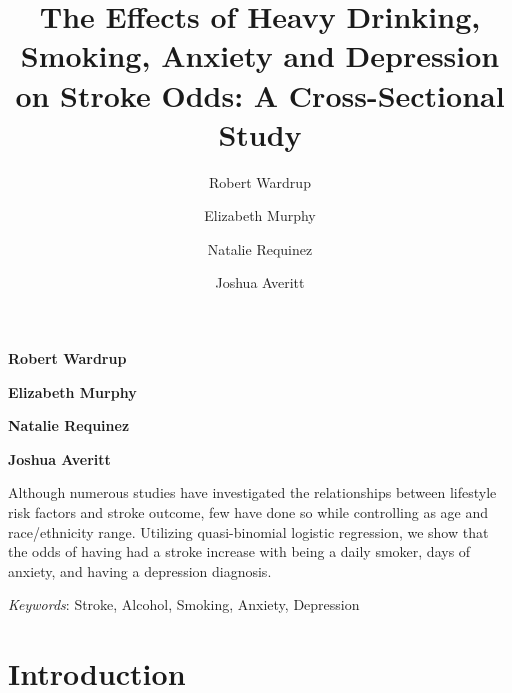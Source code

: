 \documentclass[11pt,]{article}
\title{The Effects of Heavy Drinking, Smoking, Anxiety and Depression on Stroke
Odds: A Cross-Sectional Study  }
\author{\Large Robert Wardrup\vspace{0.05in} \newline\normalsize\emph{}   \and \Large Elizabeth Murphy\vspace{0.05in} \newline\normalsize\emph{}   \and \Large Natalie Requinez\vspace{0.05in} \newline\normalsize\emph{}   \and \Large Joshua Averitt\vspace{0.05in} \newline\normalsize\emph{}  }
\date{}
\newcommand*{\authorfont}{\fontfamily{phv}\selectfont}
\renewenvironment{abstract}
 {{%
    \setlength{\leftmargin}{0mm}
    \setlength{\rightmargin}{\leftmargin}%
  }%
  \relax}
 {\endlist}
\begin{document}
	
%

{%
\setlength{\parindent}{0pt}
\thispagestyle{plain}
{\fontsize{18}{20}\selectfont\raggedright 
\maketitle  %

}

{
   \vskip 13.5pt\relax \normalsize\fontsize{11}{12} 
\textbf{\authorfont Robert Wardrup} \hskip 15pt \emph{\small }   \par \textbf{\authorfont Elizabeth Murphy} \hskip 15pt \emph{\small }   \par \textbf{\authorfont Natalie Requinez} \hskip 15pt \emph{\small }   \par \textbf{\authorfont Joshua Averitt} \hskip 15pt \emph{\small }   

}

}








\begin{abstract}

    \hbox{\vrule height .2pt width 39.14pc}

    \vskip 8.5pt %

\noindent Although numerous studies have investigated the relationships between
lifestyle risk factors and stroke outcome, few have done so while
controlling as age and race/ethnicity range. Utilizing quasi-binomial
logistic regression, we show that the odds of having had a stroke
increase with being a daily smoker, days of anxiety, and having a
depression diagnosis.


\vskip 8.5pt \noindent \emph{Keywords}: Stroke, Alcohol, Smoking, Anxiety, Depression \par

    \hbox{\vrule height .2pt width 39.14pc}



\end{abstract}


\vskip 6.5pt


\noindent  \hypertarget{introduction}{%
\section{Introduction}\label{introduction}}
\end{document}
